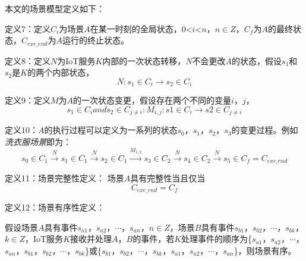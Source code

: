 \documentclass[winfonts,master,twoside]{njuthesis}
\begin{document}
本文的场景模型定义如下：

定义7：定义$C_i$为场景$A$在某一时刻的全局状态，0<$i$<$n$，$n \in Z $，$C_f$为$A$的最终状态，$C_{exe\_end}$为$A$运行的终止状态。

定义8：定义$N$为IoT服务$K$内部的一次状态转移，$N$不会更改$A$的状态，假设$s_1$和$s_2$是$K$的两个内部状态，$$N: s_1\in C_i \rightarrow s_2\in C_i $$

定义9：定义$M$为$A$的一次状态变更，假设存在两个不同的变量$i$，$j$，
$$ s_1\in C_i and s_2 \in C_{j\neq i} : M_{i,j} : s1\in C_i \rightarrow s2\in C_{j \neq i}$$

定义10：$A$的执行过程可以定义为一系列的状态$s_0$，$s_1$，$s_2$，$s_3$的变更过程。例如\textit{洗衣服场景}即为：
$$s_0\in C_1 \stackrel{N}{\longrightarrow} s_1 \in C_1 \stackrel{N}{\longrightarrow} s_2 \in C_1 \stackrel{M_{1,2}}{\longrightarrow} s_3 \in C_2 \stackrel{N}{\longrightarrow} s_4 \in C_2 \stackrel{N}{\longrightarrow} s_5 \in C_f = C_{exe\_end}$$

定义11：场景完整性定义：
场景$A$具有完整性当且仅当$$
C_{exe\_end} = C_f $$

定义12：场景有序性定义：

假设场景$A$具有事件$s_{a1}$，$s_{a2}$，$\cdots$，$s_{an}$，$n \in Z $，场景$B$具有事件$s_{b1}$，$s_{b2}$，$\cdots$，$s_{bk}$，$k \in Z $，IoT服务$K$接收并处理$A$，$B$的事件，若$K$处理事件的顺序为\{$s_{a1}$，$s_{a2}$，$\cdots$，$s_{an}$，$s_{b1}$，$s_{b2}$，$\cdots$，$s_{bk}$\}或\{$s_{b1}$，$s_{b2}$，$\cdots$，$s_{bk}$，$s_{a1}$，$s_{a2}$，$\cdots$，$s_{an}$\}，则场景有序。
\end{document}
